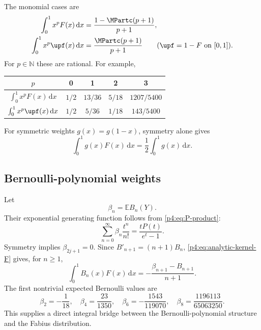 \documentclass[11pt,oneside]{article}
\theoremstyle{definition}
\theoremstyle{remark}
\newcommand{\F}{F}
\newcommand{\E}{\mathbb E}
\newcommand{\N}{\mathbb N}
\newcommand{\dd}{\,\mathrm d}
\newcommand{\1}{\mathbf 1}
\begin{document}
The monomial cases are
\begin{align}
 \int_0^1x^p\F(x)\dd x&=\frac{1-\MPartc(p+1)}{p+1},
 \label{p4:eq:monomial-F-definite}\\
 \int_0^1x^p\upf(x)\dd x&=\frac{\MPartc(p+1)}{p+1}
 \qquad(\upf=1-\F\text{ on }[0,1]).
 \label{p4:eq:monomial-up-definite}
\end{align}
For \(p\in\N\) these are rational.  For example,
\begin{center}
\begin{tabular}{@{}c|cccc@{}}
\toprule
\(p\)&0&1&2&3\\
\midrule
\(\int_0^1x^p\F(x)\dd x\)&\(1/2\)&\(13/36\)&\(5/18\)&\(1207/5400\)\\
\(\int_0^1x^p\upf(x)\dd x\)&\(1/2\)&\(5/36\)&\(1/18\)&\(143/5400\)\\
\bottomrule
\end{tabular}
\end{center}

For symmetric weights \(g(x)=g(1-x)\), symmetry alone gives
\begin{equation}\label{p4:eq:symmetric-weight}
 \int_0^1g(x)\F(x)\dd x=\frac12\int_0^1g(x)\dd x.
\end{equation}

\subsection{Bernoulli-polynomial weights}

Let
\begin{equation}\label{p4:eq:beta-n-def}
 \beta_n=\E B_n(Y).
\end{equation}
Their exponential generating function follows from \cref{p4:eq:P-product}:
\begin{equation}\label{p4:eq:beta-egf}
 \sum_{n=0}^{\infty}\beta_n\frac{t^n}{n!}
 =\frac{tP(t)}{e^t-1}.
\end{equation}
Symmetry implies \(\beta_{2j+1}=0\).  Since
\(B'_{n+1}=(n+1)B_n\), \cref{p4:eq:analytic-kernel-F} gives, for \(n\ge1\),
\begin{equation}\label{p4:eq:Bernoulli-F-integral}
 \int_0^1B_n(x)\F(x)\dd x
 =-\frac{\beta_{n+1}-B_{n+1}}{n+1}.
\end{equation}
The first nontrivial expected Bernoulli values are
\begin{equation}\label{p4:eq:beta-values}
 \beta_2=-\frac1{18},\quad
 \beta_4=\frac{23}{1350},\quad
 \beta_6=-\frac{1543}{119070},\quad
 \beta_8=\frac{1196113}{65063250}.
\end{equation}
This supplies a direct integral bridge between the Bernoulli-polynomial structure and
the Fabius distribution.
\end{document}
